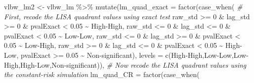 \documentclass[
]{book}
\newenvironment{Shaded}{\begin{snugshade}}{\end{snugshade}}
\newcommand{\AttributeTok}[1]{\textcolor[rgb]{0.77,0.63,0.00}{#1}}
\newcommand{\CommentTok}[1]{\textcolor[rgb]{0.56,0.35,0.01}{\textit{#1}}}
\newcommand{\DecValTok}[1]{\textcolor[rgb]{0.00,0.00,0.81}{#1}}
\newcommand{\FloatTok}[1]{\textcolor[rgb]{0.00,0.00,0.81}{#1}}
\newcommand{\FunctionTok}[1]{\textcolor[rgb]{0.00,0.00,0.00}{#1}}
\newcommand{\NormalTok}[1]{#1}
\newcommand{\OtherTok}[1]{\textcolor[rgb]{0.56,0.35,0.01}{#1}}
\newcommand{\SpecialCharTok}[1]{\textcolor[rgb]{0.00,0.00,0.00}{#1}}
\newcommand{\StringTok}[1]{\textcolor[rgb]{0.31,0.60,0.02}{#1}}
\begin{document}
\begin{Shaded}
\begin{Highlighting}[]
\NormalTok{vlbw\_lm2 }\OtherTok{\textless{}{-}}\NormalTok{ vlbw\_lm }\SpecialCharTok{\%\textgreater{}\%}
  \FunctionTok{mutate}\NormalTok{(}\AttributeTok{lm\_quad\_exact =} \FunctionTok{factor}\NormalTok{(}\FunctionTok{case\_when}\NormalTok{(}
    \CommentTok{\# First, recode the LISA quadrant values using exact test}
\NormalTok{           raw\_std }\SpecialCharTok{\textgreater{}=} \DecValTok{0} \SpecialCharTok{\&}\NormalTok{ lag\_std }\SpecialCharTok{\textgreater{}=} \DecValTok{0} \SpecialCharTok{\&}\NormalTok{ pvalExact }\SpecialCharTok{\textless{}} \FloatTok{0.05} \SpecialCharTok{\textasciitilde{}} \StringTok{\textquotesingle{}High{-}High\textquotesingle{}}\NormalTok{,}
\NormalTok{            raw\_std }\SpecialCharTok{\textless{}=} \DecValTok{0} \SpecialCharTok{\&}\NormalTok{ lag\_std }\SpecialCharTok{\textless{}=} \DecValTok{0} \SpecialCharTok{\&}\NormalTok{ pvalExact }\SpecialCharTok{\textless{}} \FloatTok{0.05} \SpecialCharTok{\textasciitilde{}} \StringTok{\textquotesingle{}Low{-}Low\textquotesingle{}}\NormalTok{,}
\NormalTok{            raw\_std }\SpecialCharTok{\textless{}=} \DecValTok{0} \SpecialCharTok{\&}\NormalTok{ lag\_std }\SpecialCharTok{\textgreater{}=} \DecValTok{0} \SpecialCharTok{\&}\NormalTok{ pvalExact }\SpecialCharTok{\textless{}} \FloatTok{0.05} \SpecialCharTok{\textasciitilde{}} \StringTok{\textquotesingle{}Low{-}High\textquotesingle{}}\NormalTok{,}
\NormalTok{            raw\_std }\SpecialCharTok{\textgreater{}=} \DecValTok{0} \SpecialCharTok{\&}\NormalTok{ lag\_std }\SpecialCharTok{\textless{}=} \DecValTok{0} \SpecialCharTok{\&}\NormalTok{ pvalExact }\SpecialCharTok{\textless{}} \FloatTok{0.05} \SpecialCharTok{\textasciitilde{}} \StringTok{\textquotesingle{}High{-}Low\textquotesingle{}}\NormalTok{,}
\NormalTok{            pvalExact }\SpecialCharTok{\textgreater{}=} \FloatTok{0.05} \SpecialCharTok{\textasciitilde{}} \StringTok{\textquotesingle{}Non{-}significant\textquotesingle{}}\NormalTok{),}
           \AttributeTok{levels =} \FunctionTok{c}\NormalTok{(}\StringTok{\textquotesingle{}High{-}High\textquotesingle{}}\NormalTok{,}\StringTok{\textquotesingle{}Low{-}Low\textquotesingle{}}\NormalTok{,}\StringTok{\textquotesingle{}Low{-}High\textquotesingle{}}\NormalTok{,}\StringTok{\textquotesingle{}High{-}Low\textquotesingle{}}\NormalTok{,}\StringTok{\textquotesingle{}Non{-}significant\textquotesingle{}}\NormalTok{)),}
    \CommentTok{\# Now recode the LISA quadrant values using the constant{-}risk simulation}
          \AttributeTok{lm\_quad\_CR =} \FunctionTok{factor}\NormalTok{(}\FunctionTok{case\_when}\NormalTok{(}

\end{Highlighting}
\end{Shaded}
\end{document}
